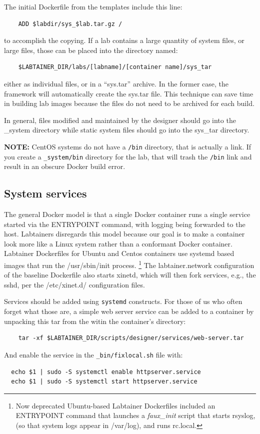 \documentclass[12pt]{article}
\begin{document}
The initial Dockerfile from the templates include this line:
\begin{verbatim}
    ADD $labdir/sys_$lab.tar.gz /
\end{verbatim}
\noindent to accomplish the copying. 
If a lab contains a large quantity of system files, or large files, those
can be placed into the directory named:
\begin{verbatim}
    $LABTAINER_DIR/labs/[labname]/[container name]/sys_tar
\end{verbatim}
either as individual files, or in a ``sys.tar'' archive.  In the former case,
the framework will automatically create the sys.tar file.  This technique 
can save time in building lab images because the files do not need to be 
archived for each build.  

In general, files modified and maintained by the designer should go into the
\_system directory while static system files should go into the sys\_tar directory.

\textbf{NOTE:} CentOS systems do not have a {\tt /bin} directory, that is actually a link.  If you
create a {\tt \_system/bin} directory for the lab, that will trash the {\tt /bin} link and result in 
an obscure Docker build error.

\subsection {System services}
The general Docker 
model is that a single Docker container runs a single service started via the ENTRYPOINT command, with logging being forwarded to 
the host.  Labtainers disregards this model because our goal is to make a container look more like a Linux
system rather than a conformant Docker container.  Labtainer Dockerfiles for Ubuntu and Centos containers
use systemd based images that run the /usr/sbin/init process.  \footnote {Now deprecated Ubuntu-based Labtainer Dockerfiles included an
ENTRYPOINT command that launches a \textit{faux\_init} script that starts rsyslog, (so that system logs
appear in /var/log), and runs rc.local.}  The labtainer.network configuration of the baseline Dockerfile also starts xinetd,
which will then fork services, e.g., the sshd, per the /etc/xinet.d/ configuration files.  

Services should be added using {\tt systemd} constructs.  For those of us who often forget what those are, a simple web server
service can be added to a container by unpacking this tar from the witin the container's directory:
\begin{verbatim}
    tar -xf $LABTAINER_DIR/scripts/designer/services/web-server.tar
\end{verbatim} 
\noindent And enable the service in the {\tt \_bin/fixlocal.sh} file with:
\begin{verbatim}
  echo $1 | sudo -S systemctl enable httpserver.service
  echo $1 | sudo -S systemctl start httpserver.service
\end{verbatim}
\end{document}
